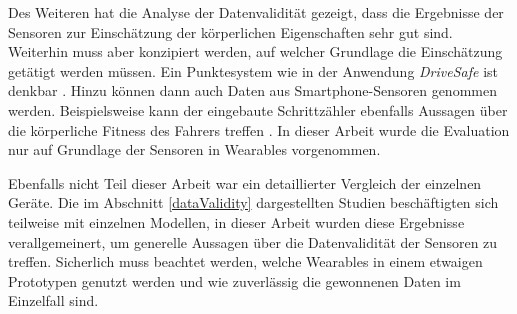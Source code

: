 Des Weiteren hat die Analyse der Datenvalidität gezeigt, dass die Ergebnisse der Sensoren zur Einschätzung der körperlichen Eigenschaften sehr gut sind. Weiterhin muss aber konzipiert werden, auf welcher Grundlage die Einschätzung getätigt werden müssen. Ein Punktesystem wie in der Anwendung \textit{DriveSafe} ist denkbar \cite{drivesafe}. Hinzu können dann auch Daten aus Smartphone-Sensoren genommen werden. Beispielsweise kann der eingebaute Schrittzähler ebenfalls Aussagen über die körperliche Fitness des Fahrers treffen \cite{validationphysicalactivitytracking,bewegungserkennungsensoren}. In dieser Arbeit wurde die Evaluation nur auf Grundlage der Sensoren in Wearables vorgenommen.

Ebenfalls nicht Teil dieser Arbeit war ein detaillierter Vergleich der einzelnen Geräte. Die im Abschnitt \ref{dataValidity} dargestellten Studien beschäftigten sich teilweise mit einzelnen Modellen, in dieser Arbeit wurden diese Ergebnisse verallgemeinert, um generelle Aussagen über die Datenvalidität der Sensoren zu treffen. Sicherlich muss beachtet werden, welche Wearables in einem etwaigen Prototypen genutzt werden und wie zuverlässig die gewonnenen Daten im Einzelfall sind.
